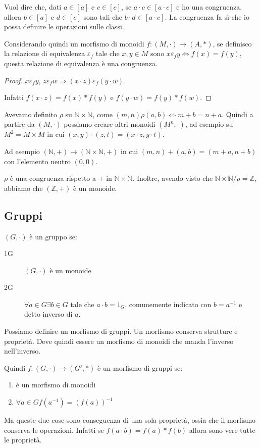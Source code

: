Vuol dire che, dati $a \in [a]$ e $c \in [c]$, se $a \cdot c \in [a \cdot c]$ e ho una congruenza, allora $b \in [a]$ e $d \in [c]$ sono tali che $b \cdot d \in [a \cdot c]$. La congruenza fa s\`i che io possa definire le operazioni sulle classi.

Considerando quindi un morfismo di monoidi $f : (M, \cdot) \to (A, \ast)$, se definisco la relazione di equivalenza $\varepsilon_f$ tale che $x, y \in M$ sono $x \varepsilon_f y \Leftrightarrow f(x) = f(y)$, questa relazione di equivalenza \`e una congruenza.
\begin{proof}
$x \varepsilon_f y$, $z \varepsilon_f w \Rightarrow (x \cdot z) \varepsilon_f (y \cdot w)$.

Infatti $f(x \cdot z) = f(x) \ast f(y)$ e $f(y \cdot w) = f(y) \ast f(w)$. 
\end{proof}

Avevamo definito $\rho$ su $\mathbb{N} \times \mathbb{N}$, come $(m, n) \rho (a, b) \Leftrightarrow m+b = n+a$. Quindi a partire da $(M, \cdot) $ possiamo creare altri monoidi $(M^n, \cdot)$, ad esempio su $M^2 = M \times M$ in cui $(x, y) \cdot (z, t) = (x \cdot z, y \cdot t)$.

Ad esempio $(\mathbb{N}, +) \to (\mathbb{N} \times \mathbb{N}, +)$ in cui $(m, n) + (a, b) = (m+a, n+b)$ con l'elemento neutro $(0,0)$.

$\rho$ \`e una congruenza rispetto a + in $\mathbb{N} \times \mathbb{N}$. Inoltre, avendo visto che $\mathbb{N} \times \mathbb{N} / \rho = \mathbb{Z}$, abbiamo che $(\mathbb{Z}, +)$ \`e un monoide.

\subsection{Gruppi}

$(G, \cdot)$ \`e un gruppo se:
\begin{description}
    \item[1G] $(G, \cdot)$ \`e un monoide
    \item[2G] $\forall a \in G \exists b \in G $ tale che $a \cdot b = 1_G$, comunemente indicato con $b = a^{-1}$ e detto inverso di $a$.
\end{description}

Possiamo definire un morfismo di gruppi. Un morfismo conserva strutture e propriet\`a. Deve quindi essere un morfismo di monoidi che manda l'inverso nell'inverso.

Quindi $f : (G, \cdot) \to (G', \ast)$ \`e un morfismo di gruppi se:
\begin{enumerate}
    \item \`e un morfismo di monoidi
    \item $\forall a \in G f(a^{-1}) = (f(a))^{-1}$
\end{enumerate}
Ma queste due cose sono conseguenza di una sola propriet\`a, ossia che il morfismo conserva le operazioni. Infatti se $f(a \cdot b) = f(a) \ast f(b)$ allora sono vere tutte le propriet\`a.

